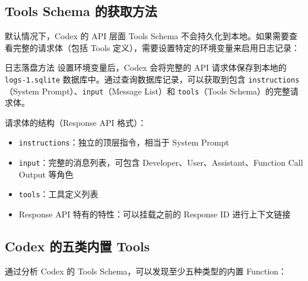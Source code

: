 \documentclass[a4paper]{article}
\begin{document}
\subsection{Tools Schema 的获取方法}

默认情况下，Codex 的 API 层面 Tools Schema 不会持久化到本地。如果需要查看完整的请求体（包括 Tools 定义），需要设置特定的环境变量来启用日志记录：

\begin{warningbox}{日志落盘方法}
设置环境变量后，Codex 会将完整的 API 请求体保存到本地的 \texttt{logs-1.sqlite} 数据库中。通过查询数据库记录，可以获取到包含 \texttt{instructions}（System Prompt）、\texttt{input}（Message List）和 \texttt{tools}（Tools Schema）的完整请求体。
\end{warningbox}

请求体的结构（Response API 格式）：

\begin{itemize}
    \item \texttt{instructions}：独立的顶层指令，相当于 System Prompt
    \item \texttt{input}：完整的消息列表，可包含 Developer、User、Assistant、Function Call Output 等角色
    \item \texttt{tools}：工具定义列表
    \item Response API 特有的特性：可以挂载之前的 Response ID 进行上下文链接
\end{itemize}

\subsection{Codex 的五类内置 Tools}

通过分析 Codex 的 Tools Schema，可以发现至少五种类型的内置 Function：
\end{document}
